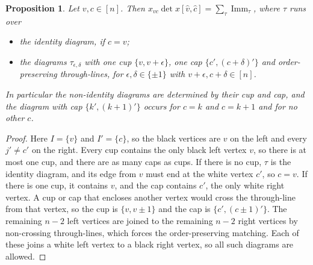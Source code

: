 \documentclass[11pt]{amsart}
\newtheorem{proposition}[theorem]{Proposition}
\theoremstyle{definition}
\theoremstyle{remark}
\newcommand{\Imm}{\operatorname{Imm}}
\begin{document}
\begin{proposition}\label{prop:colour}
Let $v,c\in[n]$. Then $x_{vc}\det x[\hat v,\hat c]=\sum_\tau\Imm_\tau$, where $\tau$ runs over
\begin{itemize}
\item the identity diagram, if $c=v$;
\item the diagrams $\tau_{\epsilon,\delta}$ with one cup $\{v,v+\epsilon\}$, one cap $\{c',(c+\delta)'\}$ and order-preserving through-lines, for $\epsilon,\delta\in\{\pm1\}$ with $v+\epsilon,c+\delta\in[n]$.
\end{itemize}
In particular the non-identity diagrams are determined by their cup and cap, and the diagram with cap $\{k',(k+1)'\}$ occurs for $c=k$ and $c=k+1$ and for no other $c$.
\end{proposition}

\begin{proof}
Here $I=\{v\}$ and $I'=\{c\}$, so the black vertices are $v$ on the left and every $j'\ne c'$ on the right. Every cup contains the only black left vertex $v$, so there is at most one cup, and there are as many caps as cups. If there is no cup, $\tau$ is the identity diagram, and its edge from $v$ must end at the white vertex $c'$, so $c=v$. If there is one cup, it contains $v$, and the cap contains $c'$, the only white right vertex. A cup or cap that encloses another vertex would cross the through-line from that vertex, so the cup is $\{v,v\pm1\}$ and the cap is $\{c',(c\pm1)'\}$. The remaining $n-2$ left vertices are joined to the remaining $n-2$ right vertices by non-crossing through-lines, which forces the order-preserving matching. Each of these joins a white left vertex to a black right vertex, so all such diagrams are allowed.
\end{proof}
\end{document}

